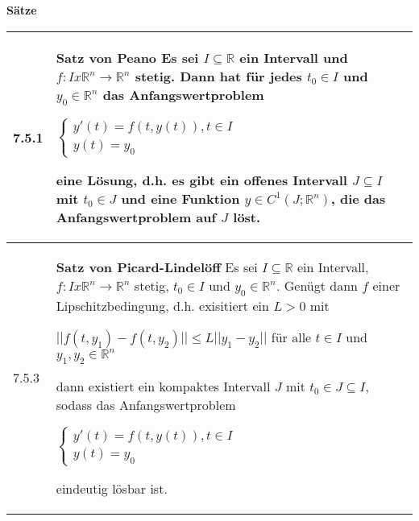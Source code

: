     \noindent 
    \textbf{Sätze}
    \begin{table}[H]
    \begin{tabularx}{\textwidth}{X m{16cm}}
        \toprule

        7.5.1 & \textbf{Satz von Peano} \hfill \break
                Es sei $I \subseteq \mathbb{R}$ ein Intervall und $f: I x \mathbb{R}^n \rightarrow \mathbb{R}^n$ stetig. Dann hat
                für jedes $t_0 \in I$ und $y_0 \in \mathbb{R}^n$ das Anfangswertproblem \hfill \break
                \centerline{$   \begin{cases}
                                y'(t) = f(t,y(t)), t\in I \\
                                y(t) = y_0 
                                \end{cases} $} 
                eine Lösung, d.h. es gibt ein offenes Intervall $J \subseteq I$ mit $t_0 \in J$ und eine Funktion $y \in C^1(J;\mathbb{R}^n)$, 
                die das Anfangswertproblem auf $J$ löst. \\
        \midrule
        7.5.3 & \textbf{Satz von Picard-Lindelöff} \hfill \break
                Es sei $I \subseteq \mathbb{R}$ ein Intervall, $f: I x \mathbb{R}^n \rightarrow \mathbb{R}^n$ stetig, $t_0 \in I$ und 
                $y_0 \in \mathbb{R}^n$. Genügt dann $f$ einer Lipschitzbedingung, d.h. exisitiert ein $L > 0$ mit \hfill \break
                \centerline{$ ||f(t,y_1) -f(t,y_2)|| \leq L||y_1 - y_2||$ für alle $t\in I$ und $y_1,y_2 \in \mathbb{R}^n $}
                dann existiert ein kompaktes Intervall $J$ mit $t_0 \in J \subseteq I$, sodass das Anfangswertproblem \hfill \break
                \centerline{$   \begin{cases}
                                y'(t) = f(t,y(t)), t\in I \\
                                y(t) = y_0 
                                \end{cases} $}
                eindeutig lösbar ist. \\
        \bottomrule
    \end{tabularx}
    \end{table}

